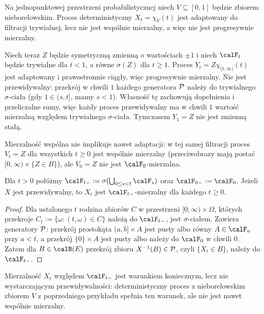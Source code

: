 \begin{przyklad}
Na jednopunktowej przestrzeni probabilistycznej niech
$V\subseteq[0,1]$ będzie zbiorem nieborelowskim.
Proces deterministyczny $X_t=\chi_V(t)$ jest adaptowany
do filtracji trywialnej, lecz nie jest wspólnie mierzalny,
a więc nie jest progresywnie mierzalny.

Niech teraz $Z$ będzie symetryczną zmienną o wartościach
$\pm1$ i niech $\calF_t$ będzie trywialne dla $t<1$,
a równe $\sigma(Z)$ dla $t\ge1$.
Proces $Y_t=Z\chi_{[1,\infty)}(t)$ jest adaptowany
i prawostronnie ciągły, więc progresywnie mierzalny.
Nie jest przewidywalny: przekrój w chwili $1$ każdego
generatora $\cal P$ należy do trywialnego $\sigma$-ciała
(gdy $1\in(s,t]$, mamy $s<1$).
Własność tę zachowują dopełnienia i przeliczalne sumy,
więc każdy proces przewidywalny ma w chwili $1$
wartość mierzalną względem trywialnego $\sigma$-ciała.
Tymczasem $Y_1=Z$ nie jest zmienną stałą.

Mierzalność wspólna nie implikuje nawet adaptacji:
w tej samej filtracji proces $V_t=Z$ dla wszystkich
$t\ge0$ jest wspólnie mierzalny (przeciwobrazy mają
postać $[0,\infty)\times\{Z\in B\}$), ale $V_0=Z$
nie jest $\calF_0$-mierzalna.
\end{przyklad}

\begin{stwierdzenie}
Dla $t>0$ połóżmy
$\calF_{t-}:=\sigma(\bigcup_{0\le s<t}\calF_s)$
oraz $\calF_{0-}:=\calF_0$. Jeżeli $X$ jest
przewidywalny, to $X_t$ jest $\calF_{t-}$-mierzalny
dla każdego $t\ge0$.
\end{stwierdzenie}
\begin{proof}
Dla ustalonego $t$ rodzina zbiorów $C$ w przestrzeni
$[0,\infty)\times\Omega$, których przekroje
$C_t:=\{\omega:(t,\omega)\in C\}$ należą do
$\calF_{t-}$, jest $\sigma$-ciałem. Zawiera generatory
$\cal P$: przekrój prostokąta $(a,b]\times A$
jest pusty albo równy $A\in\calF_a$ przy $a<t$,
a przekrój $\{0\}\times A$ jest pusty albo należy do
$\calF_0$ w chwili $0$. Zatem dla $B\in\calB(E)$
przekrój zbioru $X^{-1}(B)\in\cal P$, czyli
$\{X_t\in B\}$, należy do $\calF_{t-}$.
\end{proof}
\begin{uwaga}
Mierzalność $X_t$ względem $\calF_{t-}$ jest warunkiem
koniecznym, lecz nie wystarczającym przewidywalności:
deterministyczny proces z nieborelowskim zbiorem $V$
z poprzedniego przykładu spełnia ten warunek, ale
nie jest nawet wspólnie mierzalny.
\end{uwaga}

